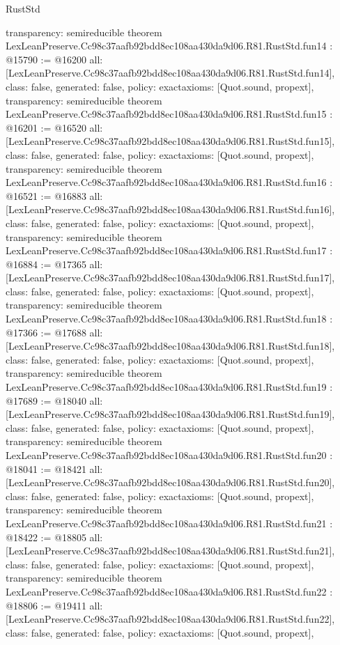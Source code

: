 \begin{lexlean}{RustStd}
\begin{coremodule}
{  transparency: semireducible
}
theorem LexLeanPreserve.Cc98c37aafb92bdd8ec108aa430da9d06.R81.RustStd.fun14 : @15790 := @16200 {
  all: [LexLeanPreserve.Cc98c37aafb92bdd8ec108aa430da9d06.R81.RustStd.fun14],
  class: false,
  generated: false,
  policy: exact{axioms: [Quot.sound, propext]},
  transparency: semireducible
}
theorem LexLeanPreserve.Cc98c37aafb92bdd8ec108aa430da9d06.R81.RustStd.fun15 : @16201 := @16520 {
  all: [LexLeanPreserve.Cc98c37aafb92bdd8ec108aa430da9d06.R81.RustStd.fun15],
  class: false,
  generated: false,
  policy: exact{axioms: [Quot.sound, propext]},
  transparency: semireducible
}
theorem LexLeanPreserve.Cc98c37aafb92bdd8ec108aa430da9d06.R81.RustStd.fun16 : @16521 := @16883 {
  all: [LexLeanPreserve.Cc98c37aafb92bdd8ec108aa430da9d06.R81.RustStd.fun16],
  class: false,
  generated: false,
  policy: exact{axioms: [Quot.sound, propext]},
  transparency: semireducible
}
theorem LexLeanPreserve.Cc98c37aafb92bdd8ec108aa430da9d06.R81.RustStd.fun17 : @16884 := @17365 {
  all: [LexLeanPreserve.Cc98c37aafb92bdd8ec108aa430da9d06.R81.RustStd.fun17],
  class: false,
  generated: false,
  policy: exact{axioms: [Quot.sound, propext]},
  transparency: semireducible
}
theorem LexLeanPreserve.Cc98c37aafb92bdd8ec108aa430da9d06.R81.RustStd.fun18 : @17366 := @17688 {
  all: [LexLeanPreserve.Cc98c37aafb92bdd8ec108aa430da9d06.R81.RustStd.fun18],
  class: false,
  generated: false,
  policy: exact{axioms: [Quot.sound, propext]},
  transparency: semireducible
}
theorem LexLeanPreserve.Cc98c37aafb92bdd8ec108aa430da9d06.R81.RustStd.fun19 : @17689 := @18040 {
  all: [LexLeanPreserve.Cc98c37aafb92bdd8ec108aa430da9d06.R81.RustStd.fun19],
  class: false,
  generated: false,
  policy: exact{axioms: [Quot.sound, propext]},
  transparency: semireducible
}
theorem LexLeanPreserve.Cc98c37aafb92bdd8ec108aa430da9d06.R81.RustStd.fun20 : @18041 := @18421 {
  all: [LexLeanPreserve.Cc98c37aafb92bdd8ec108aa430da9d06.R81.RustStd.fun20],
  class: false,
  generated: false,
  policy: exact{axioms: [Quot.sound, propext]},
  transparency: semireducible
}
theorem LexLeanPreserve.Cc98c37aafb92bdd8ec108aa430da9d06.R81.RustStd.fun21 : @18422 := @18805 {
  all: [LexLeanPreserve.Cc98c37aafb92bdd8ec108aa430da9d06.R81.RustStd.fun21],
  class: false,
  generated: false,
  policy: exact{axioms: [Quot.sound, propext]},
  transparency: semireducible
}
theorem LexLeanPreserve.Cc98c37aafb92bdd8ec108aa430da9d06.R81.RustStd.fun22 : @18806 := @19411 {
  all: [LexLeanPreserve.Cc98c37aafb92bdd8ec108aa430da9d06.R81.RustStd.fun22],
  class: false,
  generated: false,
  policy: exact{axioms: [Quot.sound, propext]},
}
\end{coremodule}
\end{lexlean}
